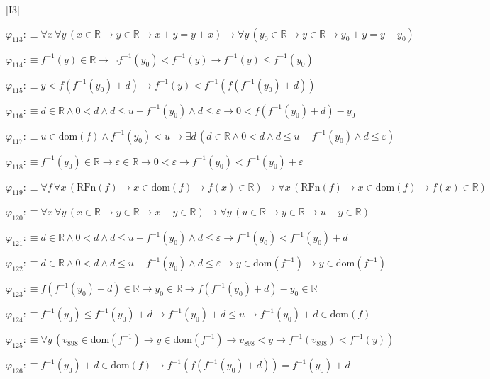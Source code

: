 \begin{fullproof}{[I3]}
\begin{abbrevlist}
\item $\varphi_{113} :\equiv \forall x\,\forall y\,(x \in \mathbb{R} \to y \in \mathbb{R} \to x + y = y + x) \to \forall y\,(y_{0} \in \mathbb{R} \to y \in \mathbb{R} \to y_{0} + y = y + y_{0})$
\item $\varphi_{114} :\equiv f^{-1}(y) \in \mathbb{R} \to \neg f^{-1}(y_{0}) < f^{-1}(y) \to f^{-1}(y) \leq f^{-1}(y_{0})$
\item $\varphi_{115} :\equiv y < f(f^{-1}(y_{0}) + d) \to f^{-1}(y) < f^{-1}(f(f^{-1}(y_{0}) + d))$
\item $\varphi_{116} :\equiv d \in \mathbb{R} \land 0 < d \land d \leq u - f^{-1}(y_{0}) \land d \leq \varepsilon \to 0 < f(f^{-1}(y_{0}) + d) - y_{0}$
\item $\varphi_{117} :\equiv u \in \mathrm{dom}(f) \land f^{-1}(y_{0}) < u \to \exists d\,(d \in \mathbb{R} \land 0 < d \land d \leq u - f^{-1}(y_{0}) \land d \leq \varepsilon)$
\item $\varphi_{118} :\equiv f^{-1}(y_{0}) \in \mathbb{R} \to \varepsilon \in \mathbb{R} \to 0 < \varepsilon \to f^{-1}(y_{0}) < f^{-1}(y_{0}) + \varepsilon$
\item $\varphi_{119} :\equiv \forall f\,\forall x\,(\mathrm{RFn}(f) \to x \in \mathrm{dom}(f) \to f(x) \in \mathbb{R}) \to \forall x\,(\mathrm{RFn}(f) \to x \in \mathrm{dom}(f) \to f(x) \in \mathbb{R})$
\item $\varphi_{120} :\equiv \forall x\,\forall y\,(x \in \mathbb{R} \to y \in \mathbb{R} \to x - y \in \mathbb{R}) \to \forall y\,(u \in \mathbb{R} \to y \in \mathbb{R} \to u - y \in \mathbb{R})$
\item $\varphi_{121} :\equiv d \in \mathbb{R} \land 0 < d \land d \leq u - f^{-1}(y_{0}) \land d \leq \varepsilon \to f^{-1}(y_{0}) < f^{-1}(y_{0}) + d$
\item $\varphi_{122} :\equiv d \in \mathbb{R} \land 0 < d \land d \leq u - f^{-1}(y_{0}) \land d \leq \varepsilon \to y \in \mathrm{dom}(f^{-1}) \to y \in \mathrm{dom}(f^{-1})$
\item $\varphi_{123} :\equiv f(f^{-1}(y_{0}) + d) \in \mathbb{R} \to y_{0} \in \mathbb{R} \to f(f^{-1}(y_{0}) + d) - y_{0} \in \mathbb{R}$
\item $\varphi_{124} :\equiv f^{-1}(y_{0}) \leq f^{-1}(y_{0}) + d \to f^{-1}(y_{0}) + d \leq u \to f^{-1}(y_{0}) + d \in \mathrm{dom}(f)$
\item $\varphi_{125} :\equiv \forall y\,(v_{898} \in \mathrm{dom}(f^{-1}) \to y \in \mathrm{dom}(f^{-1}) \to v_{898} < y \to f^{-1}(v_{898}) < f^{-1}(y))$
\item $\varphi_{126} :\equiv f^{-1}(y_{0}) + d \in \mathrm{dom}(f) \to f^{-1}(f(f^{-1}(y_{0}) + d)) = f^{-1}(y_{0}) + d$

\end{abbrevlist}
\end{fullproof}
